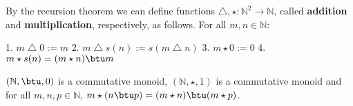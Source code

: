 \begin{definition}
\label{def-addition-multiplication-naturals}

By the recursion theorem we can define functions $\bigtriangleup, \star: \mathbb{N}^2 \rightarrow \mathbb{N}$, called \textbf{addition} and \textbf{multiplication}, respectively, as follows. For all $m, n \in \mathbb{N}$:

1. $m \bigtriangleup 0 := m$ 
2. $m \bigtriangleup s(n) := s(m \bigtriangleup n)$
3. $m \star 0 := 0$
4. $m \star s(n) = (m \star n) \btu m$

\end{definition}

\begin{theorem}
\label{theorem-add-mult-monoids-distribute}

$(\mathbb{N}, \btu, 0)$ is a commutative monoid, $(\mathbb{N}, \star, 1)$ is a commutative monoid and for all $m, n, p \in \mathbb{N}$, $m \star (n \btu p) = (m \star n) \btu (m \star p)$.

\end{theorem}


